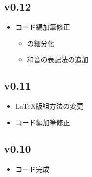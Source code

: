 \documentclass[dvipdfmx,uplatex,b5paper,openany,jbase=12Q,nomag*,textwidth-limit=44%
               ]{gachimuchi}[2020/05/05]
\begin{document}
\subsection*{v0.12}
\begin{itemize}
  \item コード編加筆修正
  \begin{itemize}
    \item {}の細分化
    \item 和音の表記法の追加
  \end{itemize}
\end{itemize}
\subsection{v0.11}
\begin{itemize}
  \item \LaTeX 版組方法の変更
  \item コード編加筆修正
\end{itemize}
\subsection{v0.10}
\begin{itemize}
  \item コード完成
\end{itemize}
\end{document}
